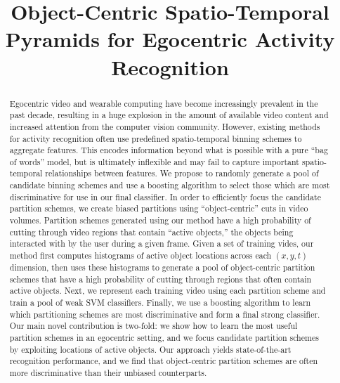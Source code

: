 \documentclass{bmvc2k}
\title{Object-Centric Spatio-Temporal Pyramids for Egocentric Activity Recognition}
\begin{document}
\maketitle

\begin{abstract}
	Egocentric video and wearable computing have become increasingly
	prevalent in the past decade, resulting in a huge explosion in the amount
	of available video content and increased attention from the computer
  vision community.
  However, existing methods for activity recognition often use
  predefined spatio-temporal binning schemes
  to aggregate features. This encodes information beyond what is possible
  with a pure ``bag of words'' model, but is ultimately inflexible
  and may fail to capture important spatio-temporal relationships between
  features.
  We propose to randomly generate a pool of candidate binning schemes and
  use a boosting algorithm to select those which are most discriminative for use in our final
  classifier. In order to efficiently focus the candidate partition schemes, we
  create biased partitions using ``object-centric'' cuts in video volumes.
  Partition schemes generated using our method have a high probability of
  cutting through video regions that contain ``active objects,'' the objects
  being interacted with by the user during a given frame.
  Given a set of training vides, our method first computes histograms of
  active object locations across each $(x, y, t)$ dimension, then uses these
  histograms to generate a pool of object-centric partition schemes that
  have a high probability of cutting through regions that often contain
  active objects.
  Next, we represent each training video using each partition scheme and train a pool
	of weak SVM classifiers. 
	Finally, we use a boosting algorithm to learn which partitioning schemes are
  most discriminative and form a
	final strong classifier. Our main novel contribution is two-fold: we show how to learn the
  most useful partition schemes in an egocentric setting, and we focus
  candidate partition schemes by exploiting locations of active objects.
  Our approach yields state-of-the-art recognition performance, and we find
  that object-centric partition schemes are often more discriminative than
  their unbiased counterparts.
\end{abstract}

\end{document}
